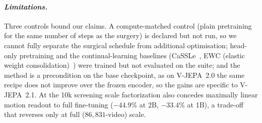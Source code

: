 \paragraph{\textbf{\emph{Limitations.}}}
Three controls bound our claims. A compute-matched control (plain pretraining for the
same number of steps as the surgery) is declared but not run, so we cannot fully
separate the surgical schedule from additional optimisation; head-only pretraining and
the continual-learning baselines (CaSSLe~\cite{fini2022cassle}, EWC (elastic weight consolidation)~\cite{kirkpatrick2017ewc}) were trained but not evaluated on the
suite; and the method is a precondition on the base checkpoint, as on V-JEPA~2.0 the
same recipe does not improve over the frozen encoder, so the gains are specific to
V-JEPA~2.1. At the 10k screening scale factorization also concedes maximally linear
motion readout to full fine-tuning ($-44.9$\% at 2B, $-33.4$\% at 1B), a trade-off
that reverses only at full ($86{,}831$-video) scale.













































